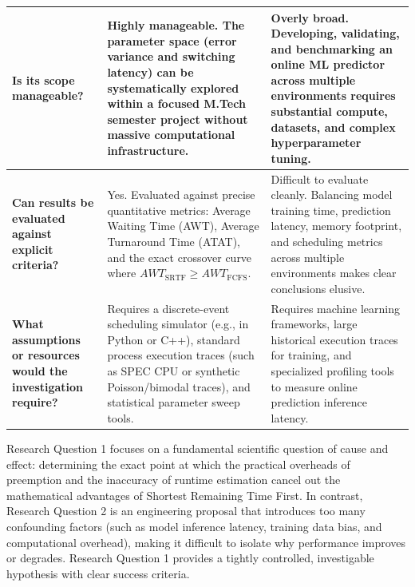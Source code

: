 \documentclass[11pt]{article}
\newcommand{\topicTitle}[1]{
    \vspace{1.2em}\noindent{\fontsize{14}{16.8}\selectfont \textbf{#1}}\par\vspace{0.5em}
}
\begin{document}
{\begin{longtable}{|>{\raggedright\arraybackslash}p{3.4cm}|>{\raggedright\arraybackslash}p{5.6cm}|>{\raggedright\arraybackslash}p{5.6cm}|}
    \textbf{Is its scope manageable?} & 
    Highly manageable. The parameter space (error variance and switching latency) can be systematically explored within a focused M.Tech semester project without massive computational infrastructure. & 
    Overly broad. Developing, validating, and benchmarking an online ML predictor across multiple environments requires substantial compute, datasets, and complex hyperparameter tuning. \\
    \hline

    \textbf{Can results be evaluated against explicit criteria?} & 
    Yes. Evaluated against precise quantitative metrics: Average Waiting Time (AWT), Average Turnaround Time (ATAT), and the exact crossover curve where $AWT_{\text{SRTF}} \ge AWT_{\text{FCFS}}$. & 
    Difficult to evaluate cleanly. Balancing model training time, prediction latency, memory footprint, and scheduling metrics across multiple environments makes clear conclusions elusive. \\
    \hline

    \textbf{What assumptions or resources would the investigation require?} & 
    Requires a discrete-event scheduling simulator (e.g., in Python or C++), standard process execution traces (such as SPEC CPU or synthetic Poisson/bimodal traces), and statistical parameter sweep tools. & 
    Requires machine learning frameworks, large historical execution traces for training, and specialized profiling tools to measure online prediction inference latency. \\
    \hline

\end{longtable}
}

\vspace{0.8em}
\topicTitle{Justification of the Chosen Question}

Research Question 1 focuses on a fundamental scientific question of cause and effect: determining the exact point at which the practical overheads of preemption and the inaccuracy of runtime estimation cancel out the mathematical advantages of Shortest Remaining Time First. In contrast, Research Question 2 is an engineering proposal that introduces too many confounding factors (such as model inference latency, training data bias, and computational overhead), making it difficult to isolate why performance improves or degrades. Research Question 1 provides a tightly controlled, investigable hypothesis with clear success criteria.
\end{document}

